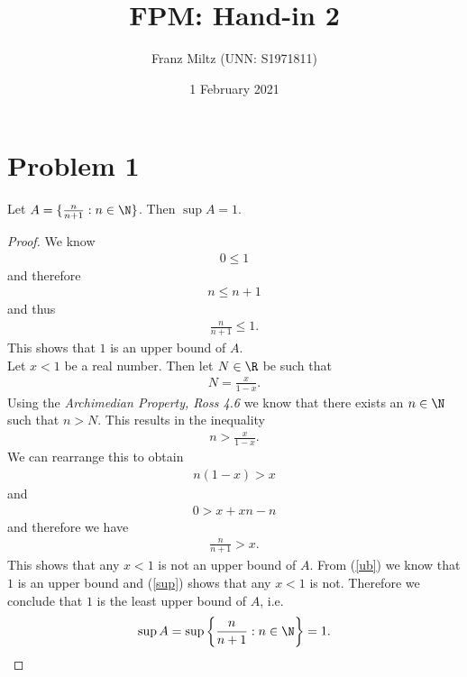 \documentclass{article}
\begin{document}
\title{FPM: Hand-in 2}
\author{Franz Miltz (UNN: S1971811)}
\date{1 February 2021}
\maketitle

\section*{Problem 1}

\begin{claim*}
   Let $A=\{\frac{n}{n+1}:n\in\N\}$. Then $\sup A = 1$.
\end{claim*}
\begin{proof}
   We know
   \begin{align*}
      0 \leq 1
   \end{align*} 
   and therefore
   \begin{align*}
      n \leq n + 1
   \end{align*}
   and thus
   \begin{align}
      \label{ub}
      \frac{n}{n+1}\leq 1.
   \end{align}
   This shows that $1$ is an upper bound of $A$.\\
   Let $x<1$ be a real number. Then let $N\in\R$ be such that
   \begin{align*}
      N = \frac{x}{1-x}.
   \end{align*}
   Using the \emph{Archimedian Property, Ross 4.6} we know that there exists
   an $n\in\N$ such that $n > N$. This results in the inequality
   \begin{align*}
      n > \frac{x}{1-x}. 
   \end{align*}
   We can rearrange this to obtain 
   \begin{align*}
      n(1-x) > x
   \end{align*}
   and 
   \begin{align*}
      0 > x + xn - n
   \end{align*}
   and therefore we have
   \begin{align}
      \label{sup}
      \frac{n}{n+1} > x.
   \end{align}
   This shows that any $x<1$ is not an upper bound of $A$.
   From (\ref{ub}) we know that $1$ is an upper bound and (\ref{sup}) shows
   that any $x<1$ is not. Therefore we conclude that
   $1$ is the least upper bound of $A$, i.e.
   \begin{align*}
      \sup A = \sup\left\{\frac{n}{n+1}:n\in\N\right\} = 1.
   \end{align*}
\end{proof}
\end{document}
